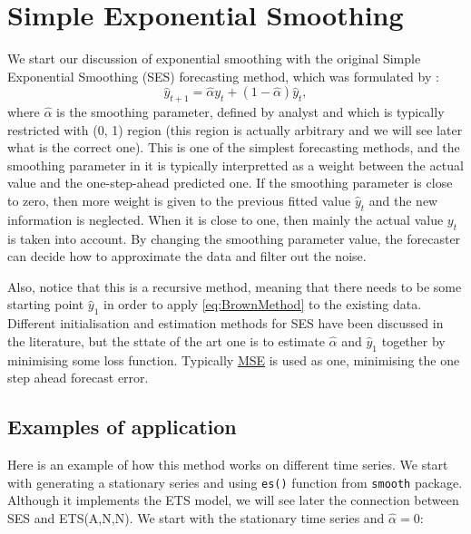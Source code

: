 \documentclass[
]{book}
\theoremstyle{definition}
\theoremstyle{definition}
\theoremstyle{definition}
\theoremstyle{definition}
\theoremstyle{remark}
\begin{document}
\hypertarget{SES}{%
\section{Simple Exponential Smoothing}\label{SES}}

We start our discussion of exponential smoothing with the original Simple Exponential Smoothing (SES) forecasting method, which was formulated by \citep{Brown1956}:
\begin{equation}
  \hat{y}_{t+1} = \hat{\alpha} {y}_{t} + (1 - \hat{\alpha}) \hat{y}_{t},
  \label{eq:BrownMethod}
\end{equation}
where \(\hat{\alpha}\) is the smoothing parameter, defined by analyst and which is typically restricted with (0, 1) region (this region is actually arbitrary and we will see later what is the correct one). This is one of the simplest forecasting methods, and the smoothing parameter in it is typically interpretted as a weight between the actual value and the one-step-ahead predicted one. If the smoothing parameter is close to zero, then more weight is given to the previous fitted value \(\hat{y}_{t}\) and the new information is neglected. When it is close to one, then mainly the actual value \({y}_{t}\) is taken into account. By changing the smoothing parameter value, the forecaster can decide how to approximate the data and filter out the noise.

Also, notice that this is a recursive method, meaning that there needs to be some starting point \(\hat{y}_1\) in order to apply \eqref{eq:BrownMethod} to the existing data. Different initialisation and estimation methods for SES have been discussed in the literature, but the sttate of the art one is to estimate \(\hat{\alpha}\) and \(\hat{y}_{1}\) together by minimising some loss function. Typically \protect\hyperlink{errorMeasures}{MSE} is used as one, minimising the one step ahead forecast error.

\hypertarget{examples-of-application}{%
\subsection{Examples of application}\label{examples-of-application}}

Here is an example of how this method works on different time series. We start with generating a stationary series and using \texttt{es()} function from \texttt{smooth} package. Although it implements the ETS model, we will see later the connection between SES and ETS(A,N,N). We start with the stationary time series and \(\hat{\alpha}=0\):
\end{document}
